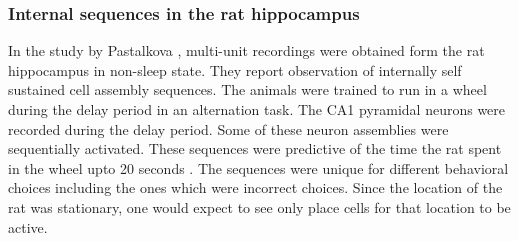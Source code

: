 \subsubsection{Internal sequences in the rat hippocampus}
In the study by Pastalkova \cite{Pastalkova2008a}, multi-unit recordings were obtained form the rat hippocampus in non-sleep state. They report observation of internally self sustained cell assembly sequences. The animals were trained to run in a wheel during the delay period in an alternation task. The CA1 pyramidal neurons were recorded during the delay period. Some of these neuron assemblies were sequentially activated. These sequences were predictive of the time the rat spent in the wheel upto 20 seconds \cite{Itskov2011a}. The sequences were unique for different behavioral choices including the ones which were incorrect choices. Since the location of the rat was stationary, one would expect to see only place cells for that location to be active.  \\  
[time/distance cells]

